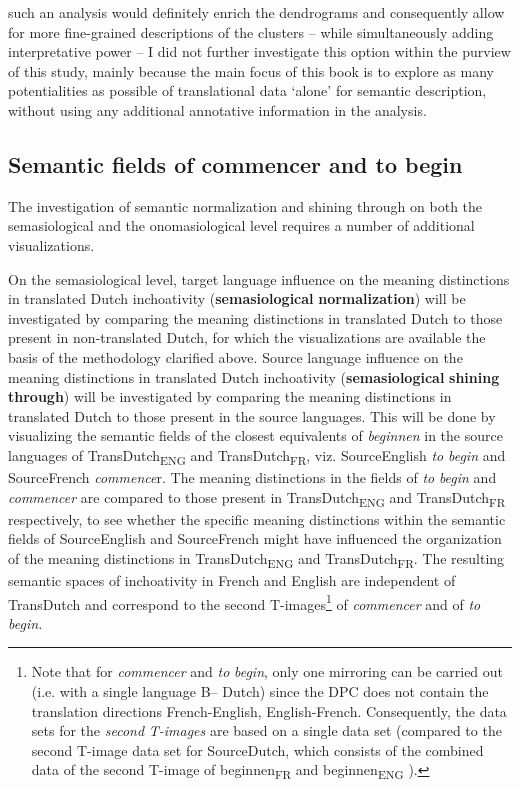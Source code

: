 such an analysis would definitely enrich the dendrograms and consequently allow for more fine-grained descriptions of the clusters – while simultaneously adding interpretative power – I did not further investigate this option within the purview of this study, mainly because the main focus of this book is to explore as many potentialities as possible of translational data ‘alone’ for semantic description, without using any additional annotative information in the analysis.


\subsection{\label{sec:3.8.2}  Semantic fields of commencer and to begin}

The investigation of semantic normalization and shining through on both the semasiological and the onomasiological level requires a number of additional visualizations.



On the semasiological level, target language influence on the meaning distinctions in translated Dutch inchoativity (\textbf{semasiological} \textbf{normalization}) will be investigated by comparing the meaning distinctions in translated Dutch to those present in non-translated Dutch, for which the visualizations are available the basis of the methodology clarified above. Source language influence on the meaning distinctions in translated Dutch inchoativity (\textbf{semasiological} \textbf{shining} \textbf{through}) will be investigated by comparing the meaning distinctions in translated Dutch to those present in the source languages. This will be done by visualizing the semantic fields of the closest equivalents of \textit{beginnen} in the source languages of TransDutch\textsubscript{ENG} and TransDutch\textsubscript{FR}, viz. SourceEnglish \textit{to} \textit{begin} and SourceFrench \textit{commence}r. The meaning distinctions in the fields of \textit{to} \textit{begin} and \textit{commencer} are compared to those present in TransDutch\textsubscript{ENG} and TransDutch\textsubscript{FR} respectively, to see whether the specific meaning distinctions within the semantic fields of SourceEnglish and SourceFrench might have influenced the organization of the meaning distinctions in TransDutch\textsubscript{ENG} and TransDutch\textsubscript{FR}. The resulting semantic spaces of inchoativity in French and English are independent of TransDutch and correspond to the second T-images\footnote{Note that for \textit{commencer} and \textit{to} \textit{begin}, only one mirroring can be carried out (i.e. with a single language B– Dutch) since the DPC does not contain the translation directions French-English, English-French. Consequently, the data sets for the \textit{second} \textit{T-images} are based on a single data set (compared to the second T-image data set for SourceDutch, which consists of the combined data of the second T-image of beginnen\textsubscript{FR} and beginnen\textsubscript{ENG} ).} of \textit{commencer} and of \textit{to} \textit{begin.}




